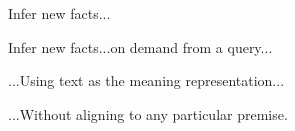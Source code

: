 \documentclass[hyperref]{beamer}
\begin{document}
\begin{frame}[noframenumbering]{Infer new facts...}
\begin{center}
  \teaserBlindInferenceNaturalOrder
\end{center}
\end{frame}

\begin{frame}[noframenumbering]{Infer new facts...on demand from a query...}
\begin{center}
  \teaserBlindInference
\end{center}
\end{frame}

\begin{frame}[noframenumbering]{...Using text as the meaning representation...}
\begin{center}
  \teaserInference
\end{center}
\end{frame}

\begin{frame}[noframenumbering]{...Without aligning to any particular premise.}
\begin{center}
  \teaserFullDerivation
\end{center}
\end{frame}


\begin{frame}{}
\begin{center}
  \teaserManyPremises
\end{center}
\end{frame}

\begin{frame}[noframenumbering]{}
\begin{center}
  \teaserBlindInferenceNaturalOrder
\end{center}
\end{frame}
\end{document}
